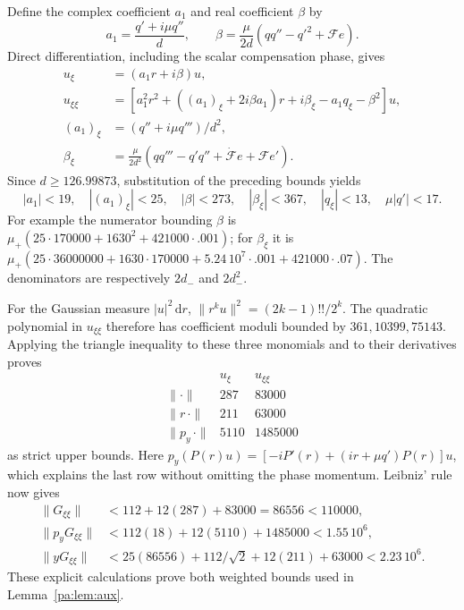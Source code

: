\documentclass[11pt]{article}
\theoremstyle{definition}\newtheorem{definition}[theorem]{Definition}
\theoremstyle{remark}\newtheorem{remark}[theorem]{Remark}
\newcommand{\dd}{\,\mathrm d}\newcommand{\Imv}{\operatorname{Im}}\newcommand{\ii}{\mathrm i}
\begin{document}
Define the complex coefficient $a_1$ and real coefficient $\beta$ by
\[
 a_1=\frac{q'+i\mu q''}{d},\qquad
 \beta=\frac{\mu}{2d}(qq''-q'^2+\mathcal F e).
\]
Direct differentiation, including the scalar compensation phase, gives
\begin{align*}
 u_\xi&=(a_1r+i\beta)u,\\
 u_{\xi\xi}&=\left[a_1^2r^2+
 ((a_1)_\xi+2i\beta a_1)r+
 i\beta_\xi-a_1q_\xi-\beta^2\right]u,\\
 (a_1)_\xi&=(q''+i\mu q''')/d^2,\\
 \beta_\xi&=\frac{\mu}{2d^2}
 (qq'''-q'q''+\dot{\mathcal F}e+\mathcal F e').
\end{align*}
Since $d\ge126.99873$, substitution of the preceding bounds yields
\[
 |a_1|<19,\quad |(a_1)_\xi|<25,\quad |\beta|<273,
 \quad |\beta_\xi|<367,\quad |q_\xi|<13,
 \quad \mu|q'|<17.
\]
For example the numerator bounding $\beta$ is
$\mu_+(25\cdot170000+1630^2+421000\cdot.001)$;
for $\beta_\xi$ it is
$\mu_+(25\cdot36000000+1630\cdot170000
+5.24\,10^7\cdot.001+421000\cdot.07)$.
The denominators are respectively $2d_-$ and $2d_-^2$.

For the Gaussian measure $|u|^2\dd r$,
$\|r^k u\|^2=(2k-1)!!/2^k$. The quadratic polynomial in
$u_{\xi\xi}$ therefore has coefficient moduli bounded by
$361,10399,75143$. Applying the triangle inequality to these three
monomials and to their derivatives proves
\[
 \begin{array}{c|rr}
 &u_\xi&u_{\xi\xi}\\\hline
 \|\cdot\|&287&83000\\
 \|r\,\cdot\|&211&63000\\
 \|p_y\,\cdot\|&5110&1485000
 \end{array}
\]
as strict upper bounds. Here
$p_y(P(r)u)=[-iP'(r)+(ir+\mu q')P(r)]u$, which explains the
last row without omitting the phase momentum. Leibniz' rule now gives
\begin{align*}
 \|G_{\xi\xi}\|&<112+12(287)+83000=86556<110000,\\
 \|p_yG_{\xi\xi}\|&<112(18)+12(5110)+1485000<1.55\,10^6,\\
 \|yG_{\xi\xi}\|&<25(86556)+112/\sqrt2+12(211)+63000
                         <2.23\,10^6.
\end{align*}
These explicit calculations prove both weighted bounds used in
Lemma~\ref{pa:lem:aux}.
\end{document}
